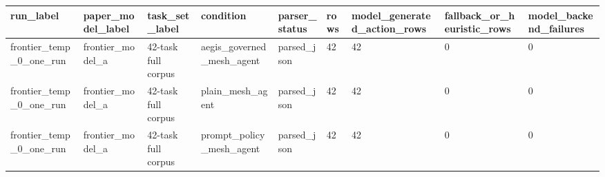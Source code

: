 \begin{tabular}{lllllllll}
 \hline
run\_label & paper\_model\_label & task\_set\_label & condition & parser\_status & rows & model\_generated\_action\_rows & fallback\_or\_heuristic\_rows & model\_backend\_failures \\
 \hline
frontier\_temp\_0\_one\_run & frontier\_model\_a & 42-task full corpus & aegis\_governed\_mesh\_agent & parsed\_json & 42 & 42 & 0 & 0 \\
frontier\_temp\_0\_one\_run & frontier\_model\_a & 42-task full corpus & plain\_mesh\_agent & parsed\_json & 42 & 42 & 0 & 0 \\
frontier\_temp\_0\_one\_run & frontier\_model\_a & 42-task full corpus & prompt\_policy\_mesh\_agent & parsed\_json & 42 & 42 & 0 & 0 \\
 \hline
\end{tabular}

